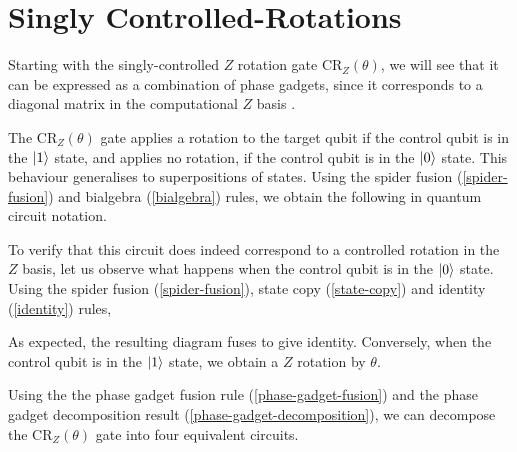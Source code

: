 \section{Singly Controlled-Rotations}

Starting with the singly-controlled $Z$ rotation gate CR$_Z(\theta)$, we will see that it can be expressed as a combination of phase gadgets, since it corresponds to a diagonal matrix in the computational $Z$ basis \cite{Yeung2020}.


The CR$_Z(\theta)$ gate applies a rotation to the target qubit if the control qubit is in the $\ket 1$ state, and applies no rotation, if the control qubit is in the $\ket 0$ state. This behaviour generalises to superpositions of states. Using the spider fusion (\ref{spider-fusion}) and bialgebra (\ref{bialgebra}) rules, we obtain the following in quantum circuit notation.


To verify that this circuit does indeed correspond to a controlled rotation in the $Z$ basis, let us observe what happens when the control qubit is in the $\ket 0$ state. Using the spider fusion (\ref{spider-fusion}), state copy (\ref{state-copy}) and identity (\ref{identity}) rules,


As expected, the resulting diagram fuses to give identity. Conversely, when the control qubit is in the $\ket 1$ state, we obtain a $Z$ rotation by $\theta$.


Using the the phase gadget fusion rule (\ref{phase-gadget-fusion}) and the phase gadget decomposition result (\ref{phase-gadget-decomposition}), we can decompose the CR$_Z(\theta)$ gate into four equivalent circuits.

